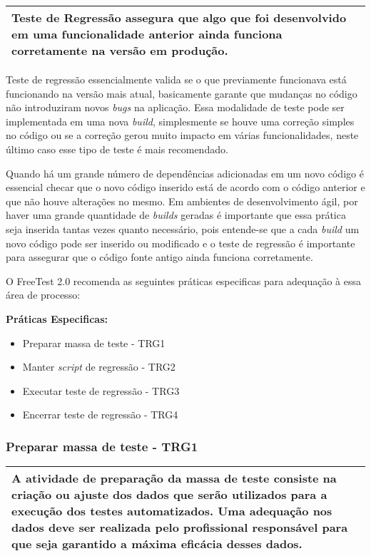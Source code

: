 \begin{table}[!ht]
\centering
\begin{tabular}{|p{130mm}|}
\hline
 Teste de Regressão assegura que algo que foi desenvolvido em uma funcionalidade anterior ainda funciona corretamente na versão em produção. \\
\hline
\end{tabular}
\end{table}

Teste de regressão essencialmente valida se o que previamente funcionava está funcionando na versão mais atual, basicamente garante que mudanças no código não introduziram novos \textit{bugs} na aplicação. Essa modalidade de teste pode ser implementada em uma nova \textit{build}, simplesmente se houve uma correção simples no código ou se a correção gerou muito impacto em várias funcionalidades, neste último caso esse tipo de teste é mais recomendado.

Quando há um grande número de dependências adicionadas em um novo código é essencial checar que o novo código inserido está de acordo com o código anterior e que não houve alterações no mesmo. Em ambientes de desenvolvimento ágil, por haver uma grande quantidade de \textit{builds} geradas é importante que essa prática seja inserida tantas vezes quanto necessário, pois entende-se que a cada \textit{build} um novo código pode ser inserido ou modificado e o teste de regressão é importante para assegurar que o código fonte antigo ainda funciona corretamente.

O FreeTest 2.0 recomenda as seguintes práticas especificas para adequação à essa área de processo:

\textbf{Práticas Especificas:}

\begin{itemize}    
    \item Preparar massa de teste - TRG1
    \item Manter \textit{script} de regressão - TRG2
    \item Executar teste de regressão - TRG3
    \item Encerrar teste de regressão - TRG4
\end{itemize}

\subsubsection{Preparar massa de teste - TRG1}
\label{sec:trg1}

\begin{table}[H]
\centering
\begin{tabular}{|p{130mm}|}
\hline
A atividade de preparação da massa de teste consiste na criação ou ajuste dos dados que serão utilizados para a execução dos testes automatizados. Uma adequação nos dados deve ser realizada pelo profissional responsável para que seja garantido a máxima eficácia desses dados. \\ 
\hline
\end{tabular}
\end{table}

